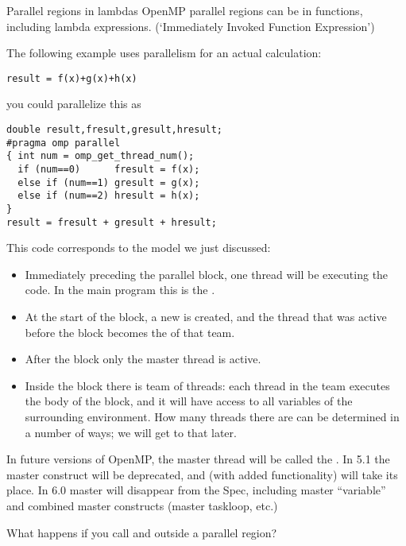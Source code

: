 \begin{cppnote}{Parallel regions in lambdas}
  OpenMP parallel regions can be in functions,
  including lambda expressions.
  (`Immediately Invoked Function Expression')
\end{cppnote}

The following example uses parallelism for an actual calculation:
\begin{lstlisting}
result = f(x)+g(x)+h(x)
\end{lstlisting}
you could parallelize this as
\begin{lstlisting}
double result,fresult,gresult,hresult;
#pragma omp parallel
{ int num = omp_get_thread_num();
  if (num==0)      fresult = f(x);
  else if (num==1) gresult = g(x);
  else if (num==2) hresult = h(x);
}
result = fresult + gresult + hresult;
\end{lstlisting}

This code corresponds to the model we just discussed:
\begin{itemize}
\item Immediately preceding the parallel block, one thread will be
  executing the code.
  In the main program this is the .
\item At the start of the block, a new  is
  created, and the thread that was active before the block
  becomes the  of that team.
\item After the block only the master thread is active.
\item Inside the block there is team of threads: each thread in the
  team executes the body of the block, and it will have access to all
  variables of the surrounding environment.
  How many
  threads there are can be determined in a number of ways; we will get to that later.
\end{itemize}

\begin{remark}
  In future versions of OpenMP, the master thread will be called
  the .
  In 5.1 the master construct will be deprecated, and  (with
  added functionality) will take its place.  In 6.0 master will
  disappear from the Spec, including  master “variable”
  and combined master constructs (master taskloop, etc.)
\end{remark}

\begin{exercise}
  What happens if you call  and 
  outside a parallel region?
\end{exercise}


